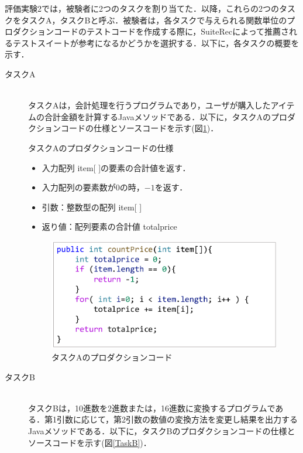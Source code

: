 \documentclass[12pt]{jarticle} %
\begin{document}
評価実験2では，被験者に2つのタスクを割り当てた．以降，これらの2つのタスクをタスクA，タスクBと呼ぶ．被験者は，各タスクで与えられる関数単位のプロダクションコードのテストコードを作成する際に，{\sf SuiteRec}によって推薦されるテストスイートが参考になるかどうかを選択する．以下に，各タスクの概要を示す．

\begin{description}
\item[タスクA]~\\
タスクAは，会計処理を行うプログラムであり，ユーザが購入したアイテムの合計金額を計算するJavaメソッドである．以下に，タスクAのプロダクションコードの仕様とソースコードを示す(図\ref{TaskA})．
\begin{itembox}[l]{タスクAのプロダクションコードの仕様}
\begin{itemize}
\item 入力配列 item[ ]の要素の合計値を返す．
\item 入力配列の要素数が0の時，$-1$を返す．
\item 引数：整数型の配列 item[ ]
\item 返り値：配列要素の合計値 totalprice
\end{itemize}
\end{itembox}

\begin{figure}[htbp]
\begin{center}
\includegraphics[clip,width=12cm]{image/taskA.pdf}
\caption{タスクAのプロダクションコード}
\label{TaskA}
\end{center}
\end{figure}

\item[タスクB]~\\
タスクBは，10進数を2進数または，16進数に変換するプログラムである．第1引数に応じて，第2引数の数値の変換方法を変更し結果を出力するJavaメソッドである．以下に，タスクBのプロダクションコードの仕様とソースコードを示す(図\ref{TaskB})．



\end{description}
\end{document}
